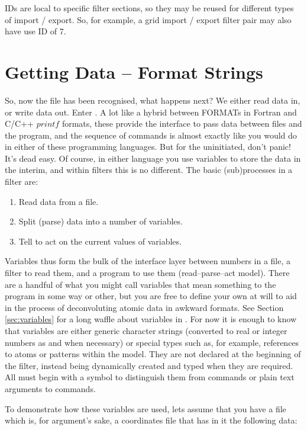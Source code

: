 IDs are local to specific filter sections, so they may be reused for different types of import / export. So, for example, a grid import / export filter pair may also have use ID of 7.

\section{Getting Data -- Format Strings}
So, now the file has been recognised, what happens next? We either read data in, or write data out. Enter . A lot like a hybrid between FORMATs in Fortran and C/C++ $printf$ formats, these provide the interface to pass data between files and the program, and the sequence of commands is almost exactly like you would do in either of these programming languages. But for the uninitiated, don't panic! It's dead easy. Of course, in either language you use variables to store the data in the interim, and within filters this is no different. The basic (sub)processes in a filter are:

\begin{enumerate}
	\item Read data from a file.
	\item Split (parse) data into a number of variables.
	\item Tell \progname{} to act on the current values of variables.
\end{enumerate}

Variables thus form the bulk of the interface layer between numbers in a file, a filter to read them, and a program to use them (read--parse--act model). There are a handful of what you might call  variables that mean something to the program in some way or other, but you are free to define your own at will to aid in the process of deconvoluting atomic data in awkward formats. See Section \ref{sec:variables} for a long waffle about variables in \progname{}. For now it is enough to know that variables are either generic character strings (converted to real or integer numbers as and when necessary) or special types such as, for example, references to atoms or patterns within the model. They are not declared at the beginning of the filter, instead being dynamically created and typed when they are required. All must begin with a \qte{\$} symbol to distinguish them from commands or plain text arguments to commands.

To demonstrate how these variables are used, lets assume that you have a file which is, for argument's sake, a coordinates file that has in it the following data:

